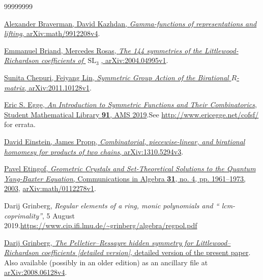 \documentclass[numbers=enddot,12pt,final,onecolumn,notitlepage]{scrartcl}%
\theoremstyle{definition}
\newenvironment{vershort}{}{}
\begin{document}
\begin{thebibliography}{99999999}                                                                                         %


%
\href{https://arxiv.org/abs/math/9912208v4}{Alexander Braverman, David
Kazhdan, \textit{Gamma-functions of representations and lifting},
arXiv:math/9912208v4}.

\href{https://arxiv.org/abs/2004.04995v1}{Emmanuel
Briand, Mercedes Rosas, \textit{The 144 symmetries of the
Littlewood-Richardson coefficients of }$\operatorname*{SL}\nolimits_{3}$,
arXiv:2004.04995v1}.

\href{https://arxiv.org/abs/2011.10128v1}{Sunita
Chepuri, Feiyang Lin, \textit{Symmetric Group Action of the Birational }%
$R$\textit{-matrix}, arXiv:2011.10128v1}.

\href{https://bookstore.ams.org/stml-91}{Eric S. Egge,
\textit{An Introduction to Symmetric Functions and Their Combinatorics},
Student Mathematical Library \textbf{91}, AMS 2019}.\newline See
\url{http://www.ericegge.net/cofsf/} for errata.

\href{https://arxiv.org/abs/1310.5294v3}{David
Einstein, James Propp, \textit{Combinatorial, piecewise-linear, and birational
homomesy for products of two chains}, arXiv:1310.5294v3}.

%
\href{https://www.tandfonline.com/doi/abs/10.1081/AGB-120018516}{Pavel
Etingof, \textit{Geometric Crystals and Set-Theoretical Solutions to the
Quantum Yang-Baxter Equation}, Communications in Algebra \textbf{31}, no. 4,
pp. 1961--1973, 2003},
\href{https://arxiv.org/abs/math/0112278v1}{arXiv:math/0112278v1}.

Darij Grinberg, \textit{Regular elements of a
ring, monic polynomials and \textquotedblleft
lcm-coprimality\textquotedblright}, 5 August 2019.\newline\url{https://www.cip.ifi.lmu.de/~grinberg/algebra/regpol.pdf}

\begin{vershort}


%
\href{http://www.cip.ifi.lmu.de/~grinberg/algebra/lrhspr-long.pdf}{Darij
Grinberg, \textit{The Pelletier--Ressayre hidden symmetry for
Littlewood--Richardson coefficients [detailed version]}, detailed version of
the present paper}. Also available (possibly in an older edition) as an
ancillary file at \href{http://arxiv.org/abs/2008.06128v4}{arXiv:2008.06128v4}.
\end{vershort}


\end{thebibliography}
\end{document}

